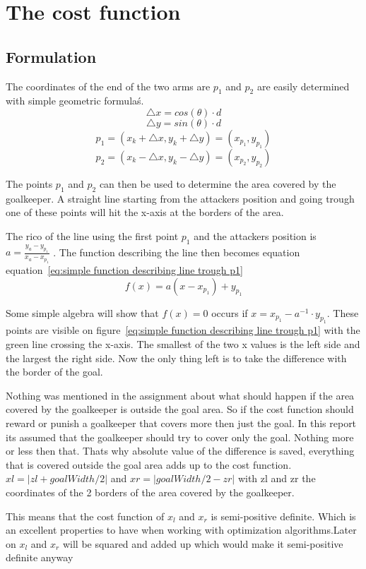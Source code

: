 \section{The cost function}
\subsection{Formulation}
The coordinates of the end of the two arms are $p_1$ and $p_2$ are easily determined with simple geometric formula\'s. 
$$\triangle x=cos(\theta) \cdot d$$
$$\triangle y = sin(\theta) \cdot d$$
$$p_1=(x_{k}+\triangle x,y_{k}+\triangle y) = (x_{p_1},y_{p_1})$$
$$p_2=(x_{k}-\triangle x,y_{k}-\triangle y) =  (x_{p_2},y_{p_2})$$

The points $p_1$ and $p_2$ can then be used to determine the area covered by the goalkeeper. A straight line starting from the attackers position and going trough one of these points will hit the x-axis at the borders of the area. 

The rico of the line using the first point $p_1$ and the attackers position is $a = \frac{y_{a}-y_{p_1}}{x_{a}-x_{p_1}}$ . The function describing the line then becomes equation equation~\ref{eq:simple function describing line trough p1}
\begin{equation}
	f(x) = a (x-x_{p_1}) + y_{p_1}
	\label{eq:simple function describing line trough p1}
\end{equation}

Some simple algebra will show that $f(x)=0$ occurs if $x=x_{p_1}-a^{-1}\cdot y_{p_1}$. These points are visible on figure~\ref{eq:simple function describing line trough p1} with the green line crossing the x-axis. The smallest of the two x values is the left side and the largest the right side. Now the only thing left is to take the difference with the border of the goal.

Nothing was mentioned in the assignment about what should happen if the area covered by the goalkeeper is outside the goal area. So if the cost function should reward or punish a goalkeeper that covers more then just the goal. In this report its assumed that the goalkeeper should try to cover only the goal. Nothing more or less then that. Thats why absolute value of the difference is saved, everything that is covered outside the goal area adds up to the cost function.  $xl=|zl+goalWidth/2|$ and $xr=|goalWidth/2-zr|$ with zl and zr the coordinates of the 2 borders of the area covered by the goalkeeper.

This means that the cost function of $x_l$ and $x_r$ is semi-positive definite. Which is an excellent properties to have when working with optimization algorithms.Later on $x_l$ and $x_r$ will be squared and added up which would make it semi-positive definite anyway

